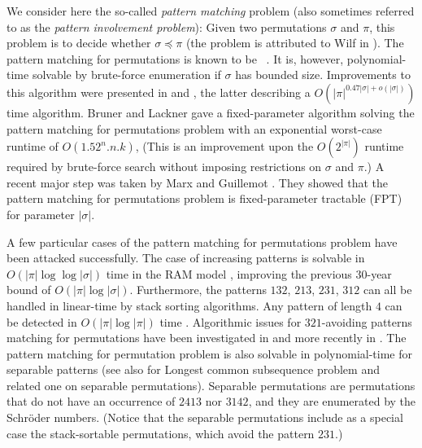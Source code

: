\documentclass[a4paper]{llncs}
\newcounter{num}
\begin{document}
We consider here the so-called \emph{pattern matching} problem
(also sometimes referred to as the \emph{pattern involvement problem}):
Given two permutations $\sigma$ and $\pi$, this problem is to decide whether
$\sigma \preceq \pi$ (the problem is attributed to Wilf in \cite{Bose:Buss:Lubiw:1998}).
The pattern matching for permutations is known to be \NPhard~\cite{Bose:Buss:Lubiw:1998}.
It is, however, polynomial-time solvable by brute-force enumeration
if $\sigma$ has bounded size.
Improvements to this algorithm were presented in
\cite{Albert:Aldred:Atkinson:Holton:ISAAC:2001} and
\cite{Ahal:Rabinovich:2008},
the latter describing a $O(|\pi|^{0.47|\sigma|+o(|\sigma|)})$ time algorithm.
Bruner and Lackner \cite{DBLP:journals/corr/abs-1204-5224}
gave a fixed-parameter algorithm solving the pattern matching for permutations problem with
an exponential worst-case runtime of $O(1.52^{n}.n.k)$,
(This is an improvement upon the $O(2^{|\pi|})$ runtime required by
brute-force search without imposing restrictions on $\sigma$ and $\pi$.)
A recent major step was taken by Marx and Guillemot
\cite{Guillemot:Marx:SODA:2014}.
They showed that
the pattern matching for permutations problem is fixed-parameter tractable (FPT) for
parameter $|\sigma|$.

A few particular cases of the pattern matching for permutations problem have been attacked successfully.
The case of increasing patterns is solvable in
$O(|\pi| \log \log |\sigma|)$ time in the RAM model \cite{Crochemore:Porat:2010},
improving the previous 30-year bound of $O(|\pi| \log |\sigma|)$.
Furthermore, the patterns $132$, $213$, $231$, $312$ can all be handled in linear-time
by stack sorting algorithms.
Any pattern of length $4$ can be detected in $O(|\pi| \log |\pi|)$ time
\cite{Albert:Aldred:Atkinson:Holton:ISAAC:2001}.
Algorithmic issues for $321$-avoiding patterns matching for permutations have been investigated in
\cite{Guillemot:Vialette:ISAAC:2009} and more recently in \cite{2015arXiv151006051A}.
The pattern matching for permutation problem is also solvable in
polynomial-time for separable patterns \cite{Ibarra:1997,Bose:Buss:Lubiw:1998}
(see also \cite{Bouvel:Rossin:Vialette:CPM:2007} for Longest common subsequence problem and related one on separable permutations).
Separable permutations are permutations that do not have an occurrence of
$2413$ nor $3142$, and they are enumerated by the Schr{\"o}der numbers.
(Notice that the separable permutations include as a special case the
stack-sortable permutations, which avoid the pattern $231$.)
\end{document}
